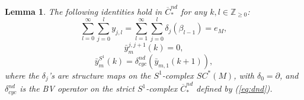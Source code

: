 \documentclass[a4paper]{article}
\newtheorem{lemma}[theorem]{Lemma}
\numberwithin{equation}{section}
\begin{document}
\begin{lemma}\label{lemma:ana}
The following identities hold in $\overline{C}_\ast^\mathit{nd}$ for any $k,l\in\mathbb{Z}_{\geq0}$:
\begin{equation}\label{eq:id1}
\sum_{l=0}^\infty\sum_{j=0}^ly_{j,l}=\sum_{l=1}^\infty\sum_{j=0}^l\delta_j(\beta_{l-1})=e_M,
\end{equation}
\begin{equation}\label{eq:id2}
\bar{y}_m^{j,j+1}(k)=0,
\end{equation}
\begin{equation}\label{eq:id3}
\bar{y}_m^{S^1}(k)=\delta_\mathit{cyc}^\mathit{nd}\left(\bar{y}_{m,1}(k+1)\right),
\end{equation}
where the $\delta_j$'s are structure maps on the $S^1$-complex $\mathit{SC}^\ast(M)$, with $\delta_0=\partial$, and $\delta_\mathit{cyc}^\mathit{nd}$ is the BV operator on the strict $S^1$-complex $\overline{C}_\ast^\mathit{nd}$ defined by (\ref{eq:dnd}).
\end{lemma}
\end{document}
